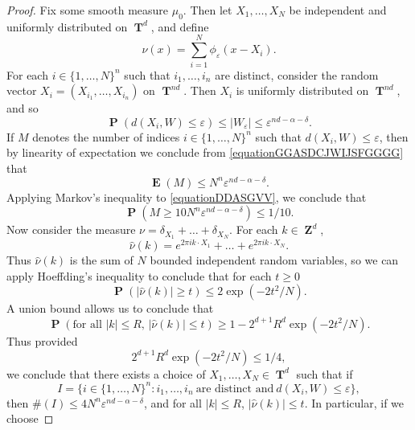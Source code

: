\documentclass[12pt,reqno]{article}
\numberwithin{equation}{section}
\DeclareMathOperator{\ZZ}{\mathbf{Z}}
\DeclareMathOperator{\TT}{\mathbf{T}}
\DeclareMathOperator{\EE}{\mathbf{E}}
\DeclareMathOperator{\PP}{\mathbf{P}}
\begin{document}
\begin{proof}
    Fix some smooth measure $\mu_0$. Then let $X_1, \dots, X_N$ be independent and uniformly distributed on $\TT^d$, and define
    \[ \nu(x) = \sum_{i = 1}^N \phi_\varepsilon(x - X_i). \]
    For each $i \in \{ 1, \dots, N \}^n$ such that $i_1, \dots, i_n$ are distinct, consider the random vector $X_i = (X_{i_1}, \dots, X_{i_n})$ on $\TT^{nd}$. Then $X_i$ is uniformly distributed on $\TT^{nd}$, and so
    \begin{equation} \label{equationGGASDCJWIJSFGGGG}
        \PP(d(X_i,W) \leq \varepsilon) \leq |W_\varepsilon| \leq \varepsilon^{nd - \alpha - \delta}.
    \end{equation}
    If $M$ denotes the number of indices $i \in \{ 1, \dots, N \}^n$ such that $d(X_i,W) \leq \varepsilon$, then by linearity of expectation we conclude from \eqref{equationGGASDCJWIJSFGGGG} that
    \begin{equation} \label{equationDDASGVV}
        \EE(M) \leq N^n \varepsilon^{nd - \alpha - \delta}.
    \end{equation}
    Applying Markov's inequality to \eqref{equationDDASGVV}, we conclude that
    \begin{equation} \label{equationFGGGSC}
        \PP(M \geq 10 N^n \varepsilon^{nd - \alpha - \delta}) \leq 1/10.
    \end{equation}
    Now consider the measure $\nu = \delta_{X_1} + \dots + \delta_{X_N}$. For each $k \in \ZZ^d$,
    \[ \widehat{\nu}(k) = e^{2 \pi i k \cdot X_1} + \dots + e^{2 \pi i k \cdot X_N}. \] 
    Thus $\widehat{\nu}(k)$ is the sum of $N$ bounded independent random variables, so we can apply Hoeffding's inequality to conclude that for each $t \geq 0$
    \[ \PP(|\widehat{\nu}(k)| \geq t) \leq 2 \exp ( - 2 t^2 / N). \]
    A union bound allows us to conclude that
    \[ \PP \left( \text{for all $|k| \leq R$, $|\widehat{\nu}(k)| \leq t$} \right) \geq 1 - 2^{d+1} R^d \exp ( - 2 t^2 / N). \]
    Thus provided
    \begin{equation} \label{probabilitybound}
        2^{d+1} R^d \exp(-2t^2/N) \leq 1/4,
    \end{equation}
    we conclude that there exists a choice of $X_1, \dots, X_N \in \TT^d$ such that if
    \[ I = \{ i \in \{ 1, \dots, N \}^n : i_1, \dots, i_n\ \text{are distinct and}\ d(X_i,W) \leq \varepsilon \}, \]
    then $\#(I) \leq 4 N^n \varepsilon^{nd - \alpha - \delta}$, and for all $|k| \leq R$, $|\widehat{\nu}(k)| \leq t$. In particular, if we choose

\end{proof}
\end{document}
